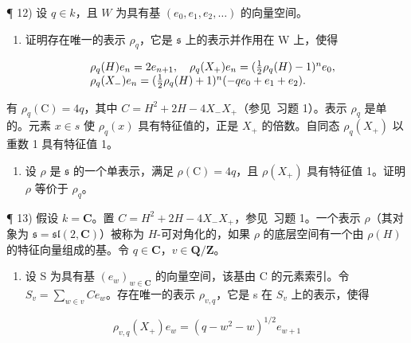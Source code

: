 
¶ 12) 设 \(q \in k\)，且 \(W\) 为具有基 \((e_0, e_1, e_2, \ldots)\) 的向量空间。

\begin{enumerate}
\def\labelenumi{\alph{enumi})}
\tightlist
\item
  证明存在唯一的表示 \(\rho_{q}\)，它是 \(\mathfrak{s}\) 上的表示并作用在 W 上，使得
\end{enumerate}

\[
\begin{array}{r l} & {\rho_ {q} (H) e _ {n} = 2 e _ {n + 1}, \quad \rho_ {q} (X _ {+}) e _ {n} = (\frac {1}{2} \rho_ {q} (H) - 1) ^ {n} e _ {0},} \\ & {\rho_ {q} (X _ {-}) e _ {n} = (\frac {1}{2} \rho_ {q} (H) + 1) ^ {n} (- q e _ {0} + e _ {1} + e _ {2}).} \end{array}
\]

有 \(\rho_{q}(\mathrm{C}) = 4q\)，其中 \(C = H^{2} + 2H - 4X_{-}X_{+}\)（参见~习题 1）。表示 \(\rho_{q}\) 是单的。元素 \(x \in s\) 使 \(\rho_{q}(x)\) 具有特征值的，正是 \(X_{+}\) 的倍数。自同态 \(\rho_{q}(X_{+})\) 以重数 1 具有特征值 1。

\begin{enumerate}
\def\labelenumi{\alph{enumi})}
\setcounter{enumi}{1}
\tightlist
\item
  设 \(\rho\) 是 \(\mathfrak{s}\) 的一个单表示，满足 \(\rho(\mathrm{C}) = 4q\)，且 \(\rho(X_{+})\) 具有特征值 1。证明 \(\rho\) 等价于 \(\rho_q\)。
\end{enumerate}

¶ 13) 假设 \(k = \mathbf{C}\)。置 \(C = H^2 + 2H - 4X_-X_+\)，参见~习题 1。一个表示 \(\rho\)（其对象为 \(\mathfrak{s} = \mathfrak{sl}(2, \mathbf{C})\)）被称为 \(H\)-可对角化的，如果 \(\rho\) 的底层空间有一个由 \(\rho(H)\) 的特征向量组成的基。令 \(q \in \mathbf{C}\)，\(v \in \mathbf{Q}/\mathbf{Z}\)。

\begin{enumerate}
\def\labelenumi{\alph{enumi})}
\tightlist
\item
  设 S 为具有基 \((e_{w})_{w\in\mathbf{C}}\) 的向量空间，该基由 C 的元素索引。令 \(S_{v}=\sum_{w\in v}Ce_{w}\)。存在唯一的表示 \(\rho_{v,q}\)，它是 s 在 \(S_{v}\) 上的表示，使得
\end{enumerate}

\[
\rho_ {v, q} (X _ {+}) e _ {w} = (q - w ^ {2} - w) ^ {1 / 2} e _ {w + 1}
\]

